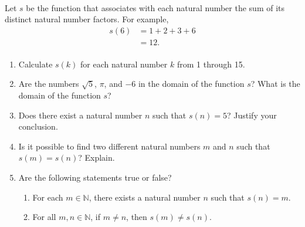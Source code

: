 \hbreak
%
\begin{previewactivity} \label{PA:sumofdivisors} \hfill \\
%
Let  $s$  \label{sym:sumdivisors} be the function that associates with each natural number the sum of its distinct natural number factors.  For example,
\[
\begin{aligned}
  s( 6 ) &= 1 + 2 + 3 + 6 \\ 
                    &= 12. \\ 
\end{aligned} 
\]
\begin{enumerate}
\item Calculate  $s( k )$ for each natural number  $k$  from  1  through 15.

\item Are the numbers $\sqrt{5}$, $\pi$, and $-6$ in the domain of the function $s$?  What is the domain of the function  $s$?


\item Does there exist a natural number  $n$  such that  $s( n ) = 5$?  Justify your conclusion.

\item Is it possible to find two different natural numbers  $m$  and  $n$  such that  \linebreak
$s( m ) = s( n )$?  Explain.

\item Are the following statements true or false?

\begin{enumerate}
  \item For each  $m \in \mathbb{N}$, there exists a natural number  $n$  such that  
$s( n ) = m$.

  \item For all $m, n \in \mathbb{N}$, if  $m \ne n$, then  $s( m ) \ne s( n )$.
\end{enumerate}

\end{enumerate}
\end{previewactivity}
\hbreak


\endinput
